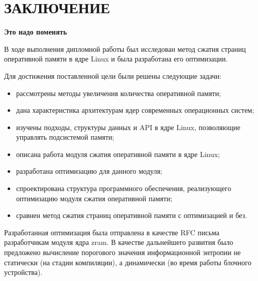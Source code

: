 \section*{ЗАКЛЮЧЕНИЕ}

\textbf{Это надо поменять}

В ходе выполнения дипломной работы был исследован метод сжатия страниц оперативной памяти в ядре Linux и была разработана его оптимизации.

Для достижения поставлен­ной цели были решены следующие задачи:

\begin{itemize}
	\item рассмотрены методы увеличения количества оперативной памяти;
	\item дана характеристика архитектурам ядер современных операционных систем;
	\item изучены подходы, структуры данных и API \cite{api} в ядре Linux, позволяющие управлять подсистемой памяти;
	\item описана работа модуля сжатия оперативной памяти в ядре Linux;
	\item разработана оптимизацию для данного модуля;
	\item спроектирована структура программного обеспечения, реализующего оптимизацию модуля сжатия оперативной памяти;
	\item сравнен метод сжатия страниц оперативной памяти с оптимизацией и без.
\end{itemize}

Разработанная оптимизация была отправлена в качестве RFC письма разработчикам модуля ядра zram. В качестве дальнейшего развития было предложено вычисление порогового значения информационной энтропии не статически (на стадии компиляции), а динамически (во время работы блочного устройства).

\pagebreak